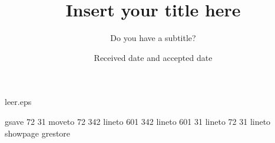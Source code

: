 %
%
%
%
\begin{filecontents}{leer.eps}

gsave
72 31 moveto
72 342 lineto
601 342 lineto
601 31 lineto
72 31 lineto
showpage
grestore
\end{filecontents}
%
\documentclass[tcfd]{svjour}
%
\usepackage{times}
\usepackage{graphics}
%

%
\title{Insert your title here}
\subtitle{Do you have a subtitle?} %
%
%
%
\date{Received date and accepted date}
%
%
\maketitle
%
\section{Introduction}
\label{intro}
Your text comes here. Separate text sections with
\section{Section title}
\label{sec:1}
and \citet{RefJ}
